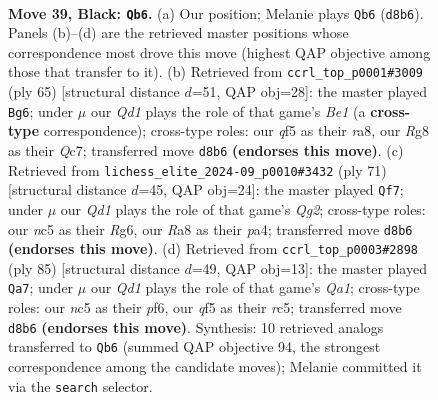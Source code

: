 \documentclass[11pt]{article}
\begin{document}
\clearpage

\begin{figure}[p]\centering
\begin{subfigure}{0.46\textwidth}\centering
\resizebox{\linewidth}{!}{%
\newchessgame
\chessboard[
  setfen={rk1q2r1/p4p1p/2p5/2N2Q2/3P4/1R4PP/5P2/6K1 b - - 0 39},
  showmover=false,
  pgfstyle=straightmove, color=movearrow, markmove={d8-b6}
]}
\caption{}
\end{subfigure}\hfill
\begin{subfigure}{0.46\textwidth}\centering
\resizebox{\linewidth}{!}{%
\newchessgame
\chessboard[
  setfen={R3b3/1rq1k1pp/4pp2/8/8/1P1Q2P1/2P4P/1NK5 b - - 2 33},
  showmover=false,
  pgfstyle=straightmove, color=movearrow, markmove={e8-g6}
]}
\caption{}
\end{subfigure}
\\[4pt]
\begin{subfigure}{0.46\textwidth}\centering
\resizebox{\linewidth}{!}{%
\newchessgame
\chessboard[
  setfen={4r1k1/6qp/1R4r1/p2p3Q/P4P2/4P3/4NK1P/8 b - - 0 36},
  showmover=false,
  pgfstyle=straightmove, color=movearrow, markmove={g7-f7}
]}
\caption{}
\end{subfigure}\hfill
\begin{subfigure}{0.46\textwidth}\centering
\resizebox{\linewidth}{!}{%
\newchessgame
\chessboard[
  setfen={q2r2k1/5p2/3P1P1p/2R3p1/7r/8/P2Q2P1/4R1K1 b - - 3 43},
  showmover=false,
  pgfstyle=straightmove, color=movearrow, markmove={a8-a7}
]}
\caption{}
\end{subfigure}
\caption{\textbf{Move 39, Black: \texttt{Qb6}.} (a) Our position; Melanie plays \texttt{Qb6} (\texttt{d8b6}). Panels (b)--(d) are the retrieved master positions whose correspondence most drove this move (highest QAP objective among those that transfer to it). (b) Retrieved from \texttt{ccrl\_top\_p0001\#3009} (ply 65) [structural distance $d$=51, QAP obj=28]: the master played \texttt{Bg6}; under $\mu$ our \emph{Qd1} plays the role of that game's \emph{Be1} (a \textbf{cross-type} correspondence); cross-type roles: our \emph{q}f5 as their \emph{r}a8, our \emph{R}g8 as their \emph{Q}c7; transferred move \texttt{d8b6} \textbf{(endorses this move)}. (c) Retrieved from \texttt{lichess\_elite\_2024-09\_p0010\#3432} (ply 71) [structural distance $d$=45, QAP obj=24]: the master played \texttt{Qf7}; under $\mu$ our \emph{Qd1} plays the role of that game's \emph{Qg2}; cross-type roles: our \emph{n}c5 as their \emph{R}g6, our \emph{R}a8 as their \emph{p}a4; transferred move \texttt{d8b6} \textbf{(endorses this move)}. (d) Retrieved from \texttt{ccrl\_top\_p0003\#2898} (ply 85) [structural distance $d$=49, QAP obj=13]: the master played \texttt{Qa7}; under $\mu$ our \emph{Qd1} plays the role of that game's \emph{Qa1}; cross-type roles: our \emph{n}c5 as their \emph{p}f6, our \emph{q}f5 as their \emph{r}c5; transferred move \texttt{d8b6} \textbf{(endorses this move)}. Synthesis: 10 retrieved analogs transferred to \texttt{Qb6} (summed QAP objective 94, the strongest correspondence among the candidate moves); Melanie committed it via the \texttt{search} selector.}
\label{fig:thought-m77}
\end{figure}
\end{document}
